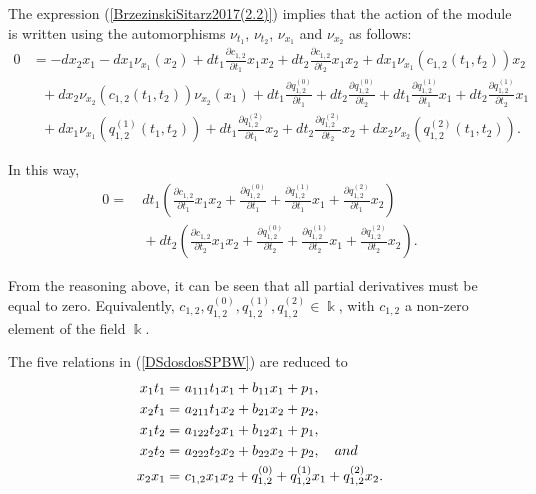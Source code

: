 \documentclass{amsart}
\theoremstyle{definition}
\theoremstyle{remark}
\numberwithin{equation}{section}
\begin{document}
The expression (\ref{BrzezinskiSitarz2017(2.2)}) implies that the action of the module is written using the automorphisms $\nu_{t_1}$, $\nu_{t_2}$, $\nu_{x_1}$ and $\nu_{x_2}$ as follows:
\begin{align*}
    0 & = -dx_2x_1-dx_1\nu_{x_1}(x_2)+dt_1\frac{\partial c_{1,2}}{\partial t_1}x_1x_2+dt_2\frac{\partial c_{1,2}}{\partial t_2}x_1x_2 
     +dx_1\nu_{x_1}(c_{1,2}(t_1, t_2))x_2 \\
     &\ \ \ + dx_2\nu_{x_2}(c_{1,2}(t_1, t_2))\nu_{x_2}(x_1) + dt_1\frac{\partial q_{1,2}^{(0)}}{\partial t_1}+dt_2\frac{\partial q_{1,2}^{(0)}}{\partial t_2}+dt_1\frac{\partial q_{1,2}^{(1)}}{\partial t_1}x_1+dt_2\frac{\partial q_{1,2}^{(1)}}{\partial t_2}x_1 \\
     &\ \ \ + dx_1\nu_{x_1}(q_{1,2}^{(1)}(t_1, t_2))+dt_1\frac{\partial q_{1,2}^{(2)}}{\partial t_1}x_2+dt_2\frac{\partial q_{1,2}^{(2)}}{\partial t_2}x_2+dx_2\nu_{x_2}(q_{1,2}^{(2)}(t_1, t_2)).
\end{align*}

In this way, 
\begin{align*}
    0 = &\ dt_1\left(\frac{\partial c_{1,2}}{\partial t_1}x_1x_2+\frac{\partial q_{1,2}^{(0)}}{\partial t_1}+\frac{\partial q_{1,2}^{(1)}}{\partial t_1}x_1+\frac{\partial q_{1,2}^{(2)}}{\partial t_1}x_2 \right) \\
    &\ + dt_2\left(\frac{\partial c_{1,2}}{\partial t_2}x_1x_2+\frac{\partial q_{1,2}^{(0)}}{\partial t_2}+\frac{\partial q_{1,2}^{(1)}}{\partial t_2}x_1+\frac{\partial q_{1,2}^{(2)}}{\partial t_2}x_2 \right).
\end{align*}

From the reasoning above, it can be seen that all partial derivatives must be equal to zero. Equivalently, $c_{1,2}, q_{1,2}^{(0)}, q_{1,2}^{(1)}, q_{1,2}^{(2)} \in \Bbbk$, with $c_{1,2}$ a non-zero element of the field $\Bbbk$.

The five relations in (\ref{DSdosdosSPBW}) are reduced to
\begin{align}
    x_1t_1 = &\  a_{111}t_1x_1+b_{11}x_1+ p_1, \label{relPBW4.1} \\
    x_2t_1  = &\ a_{211}t_1x_2+b_{21}x_2+ p_2, \label{relPBW4.2} \\
    x_1t_2 = &\ a_{122}t_2x_1+b_{12}x_1+ p_1, \label{relPBW4.3} \\
    x_2t_2  = &\ a_{222}t_2x_2+b_{22}x_2+ p_2, \quad {\rm and} \label{relPBW4.4} \\
    x_2 x_1 = &\ c_{1, 2}x_1 x_2 + q_{1,2}^{(0)} + q_{1,2}^{(1)}x_1 + q_{1,2}^{(2)}x_2. \label{relPBW4.5}
\end{align}
\end{document}
